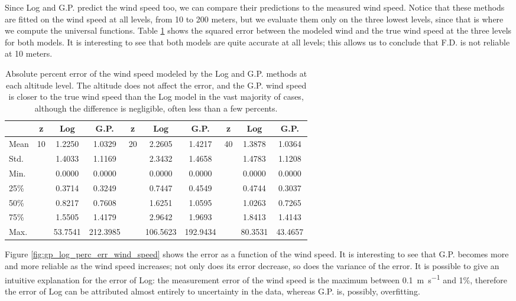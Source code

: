 \documentclass[a4paper]{book}
\begin{document}
Since Log and G.P. predict the wind speed too, we can compare their predictions to the measured wind speed. Notice that these methods are fitted on the wind speed at all levels, from 10 to 200 meters, but we evaluate them only on the three lowest levels, since that is where we compute the universal functions. Table \ref{tbl:model_wind_errors} shows the squared error between the modeled wind and the true wind speed at the three levels for both models. It is interesting to see that both models are quite accurate at all levels; this allows us to conclude that F.D. is not reliable at 10 meters.

\begin{table}[]
\centering
\caption{Absolute percent error of the wind speed modeled by the Log and G.P. methods at each altitude level. The altitude does not affect the error, and the G.P. wind speed is closer to the true wind speed than the Log model in the vast majority of cases, although the difference is negligible, often less than a few percents.}
\label{tbl:model_wind_errors}
\begin{tabular*}{\textwidth}{l @{\extracolsep{\fill}} |ccc|ccc|ccc}
\toprule
& z & Log & G.P. & z & Log & G.P. & z & Log & G.P. \\\midrule
Mean & \multirow{7}{*}{ 10 } & 1.2250 & 1.0329 & \multirow{7}{*}{ 20 } & 2.2605 & 1.4217 & \multirow{7}{*}{ 40 } & 1.3878 & 1.0364 \\
Std. & & 1.4033 & 1.1169 & & 2.3432 & 1.4658 & & 1.4783 & 1.1208 \\
Min. & & 0.0000 & 0.0000 & & 0.0000 & 0.0000 & & 0.0000 & 0.0000 \\
25\% & & 0.3714 & 0.3249 & & 0.7447 & 0.4549 & & 0.4744 & 0.3037 \\
50\% & & 0.8217 & 0.7608 & & 1.6251 & 1.0595 & & 1.0263 & 0.7265 \\
75\% & & 1.5505 & 1.4179 & & 2.9642 & 1.9693 & & 1.8413 & 1.4143 \\
Max. & & 53.7541 & 212.3985 & & 106.5623 & 192.9434 & & 80.3531 & 43.4657 \\
\bottomrule
\end{tabular*} 
\end{table}


Figure \ref{fig:gp_log_perc_err_wind_speed} shows the error as a function of the wind speed. It is interesting to see that G.P. becomes more and more reliable as the wind speed increases; not only does its error decrease, so does the variance of the error. It is possible to give an intuitive explanation for the error of Log: the measurement error of the wind speed is the maximum between \SI{0.1}{\meter\per\second} and 1\%, therefore the error of Log can be attributed almost entirely to uncertainty in the data, whereas G.P. is, possibly, overfitting.
\end{document}
